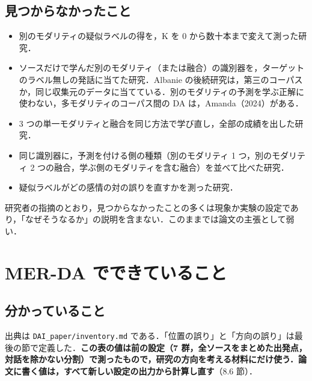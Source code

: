 \documentclass[11pt,a4paper]{ltjsarticle}
\begin{document}
\subsection{見つからなかったこと}

\begin{itemize}
  \item 別のモダリティの疑似ラベルの得を，K を 0 から数十本まで変えて測った研究．
  \item ソースだけで学んだ別のモダリティ（または融合）の識別器を，ターゲットのラベル無しの発話に当てた研究．Albanie の後続研究は，第三のコーパスか，同じ収集元のデータに当てている．別のモダリティの予測を学ぶ正解に使わない，多モダリティのコーパス間の DA は，Amanda（2024）がある．
  \item 3 つの単一モダリティと融合を同じ方法で学び直し，全部の成績を出した研究．
  \item 同じ識別器に，予測を付ける側の種類（別のモダリティ 1 つ，別のモダリティ 2 つの融合，学ぶ側のモダリティを含む融合）を並べて比べた研究．
  \item 疑似ラベルがどの感情の対の誤りを直すかを測った研究．
\end{itemize}

研究者の指摘のとおり，見つからなかったことの多くは現象か実験の設定であり，「なぜそうなるか」の説明を含まない．このままでは論文の主張として弱い．

\section{MER-DA でできていること}

\subsection{分かっていること}

出典は \texttt{DAI\_paper/inventory.md} である．「位置の誤り」と「方向の誤り」は最後の節で定義した．\textbf{この表の値は前の設定（7 群，全ソースをまとめた出発点，対話を除かない分割）で測ったもので，研究の方向を考える材料にだけ使う．論文に書く値は，すべて新しい設定の出力から計算し直す}（8.6 節）．
\end{document}
